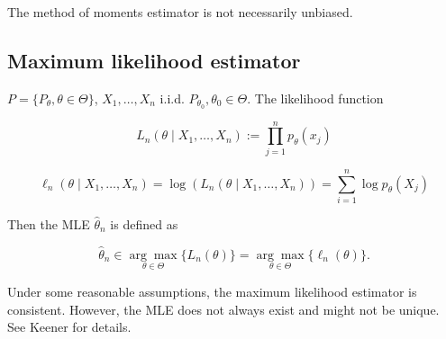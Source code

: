 \begin{remark}The method of moments estimator is not necessarily unbiased.

\end{remark}

\subsection{Maximum likelihood estimator}\label{mathstats.sec.mle}

\begin{definition}

\(P = \{P_\theta, \theta \in \Theta\}\), \(X_1, \ldots, X_n\) i.i.d. \(P_{\theta_0}, \theta_0 \in \Theta\). The likelihood function 

\[
L_n (\theta \mid X_1, \ldots, X_n) := \prod_{j=1}^n p_\theta(x_j)
\]

\[
\ell_n (\theta \mid X_1, \ldots, X_n) = \log \left( L_n (\theta \mid X_1, \ldots, X_n) \right) = \sum_{i=1}^n \log p_\theta(X_j)
\]

Then the MLE \(\hat{\theta}_n\) is defined as 

\[
\hat{\theta}_n \in \underset{\theta \in \Theta}{\arg \max} \{ L_n(\theta) \} = \underset{\theta \in \Theta}{\arg \max} \{ \ell_n(\theta) \} .
\]

\end{definition}


\begin{remark}Under some reasonable assumptions, the maximum likelihood estimator is consistent. However, the MLE does not always exist and might not be unique. See Keener for details.

\end{remark}


